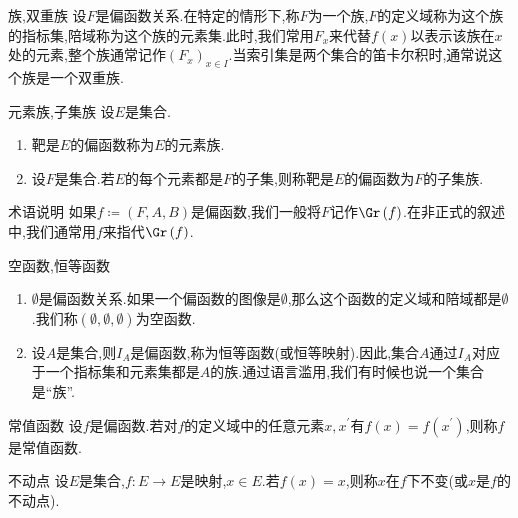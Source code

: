 \begin{definition}{族,双重族}{}
	设$F$是偏函数关系.在特定的情形下,称$F$为一个族,$F$的定义域称为这个族的指标集,陪域称为这个族的元素集.此时,我们常用$F_{x}$来代替$f\left(x\right)$以表示该族在$x$处的元素,整个族通常记作$\left(F_{x}\right)_{x\in I}$.当索引集是两个集合的笛卡尔积时,通常说这个族是一个双重族.
\end{definition}

\begin{definition}{元素族,子集族}{}
	设$E$是集合.
	\begin{enumerate}
		\item 靶是$E$的偏函数称为$E$的元素族.
		\item 设$F$是集合.若$E$的每个元素都是$F$的子集,则称靶是$E$的偏函数为$F$的子集族.
	\end{enumerate}
\end{definition}

\begin{remark}{术语说明}{}
	如果$f\coloneq\left(F,A,B\right)$是偏函数,我们一般将$F$记作$\Gr\left(f\right)$.在非正式的叙述中,我们通常用$f$来指代$\Gr\left(f\right)$.
\end{remark}

\begin{example}{空函数,恒等函数}{}
	\begin{enumerate}
		\item $\emptyset$是偏函数关系.如果一个偏函数的图像是$\emptyset$,那么这个函数的定义域和陪域都是$\emptyset$.我们称$\left(\emptyset,\emptyset,\emptyset\right)$为空函数.
		\item 设$A$是集合,则$I_{A}$是偏函数,称为恒等函数(或恒等映射).因此,集合$A$通过$I_{A}$对应于一个指标集和元素集都是$A$的族.通过语言滥用,我们有时候也说一个集合是``族''.
	\end{enumerate}
\end{example}

\begin{definition}{常值函数}{}
	设$f$是偏函数.若对$f$的定义域中的任意元素$x,x^{\prime}$有$f\left(x\right)=f\left(x^{\prime}\right)$,则称$f$是常值函数.
\end{definition}

\begin{definition}{不动点}{}
	设$E$是集合,$f:E\to E$是映射,$x\in E$.若$f\left(x\right)=x$,则称$x$在$f$下不变(或$x$是$f$的不动点).
\end{definition}





